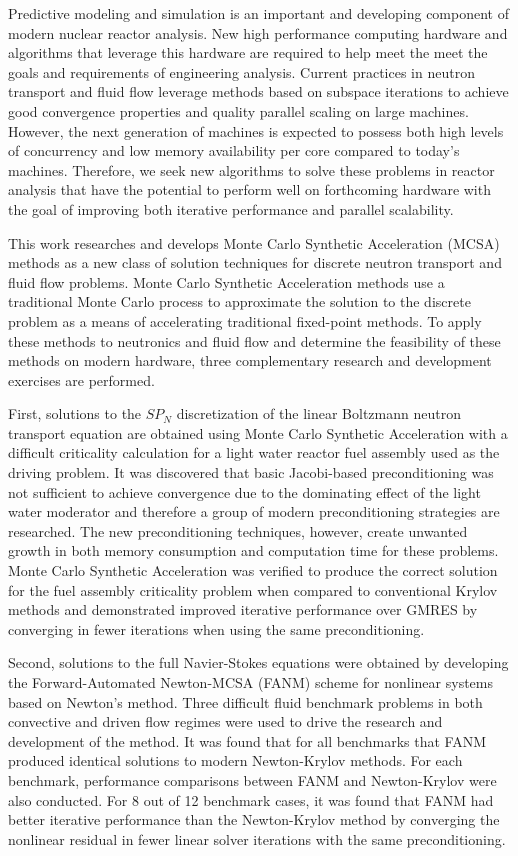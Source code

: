 Predictive modeling and simulation is an important and developing
component of modern nuclear reactor analysis. New high performance
computing hardware and algorithms that leverage this hardware are
required to help meet the meet the goals and requirements of
engineering analysis. Current practices in neutron transport and fluid
flow leverage methods based on subspace iterations to achieve good
convergence properties and quality parallel scaling on large
machines. However, the next generation of machines is expected to
possess both high levels of concurrency and low memory availability
per core compared to today's machines. Therefore, we seek new
algorithms to solve these problems in reactor analysis that have the
potential to perform well on forthcoming hardware with the goal of
improving both iterative performance and parallel scalability.

This work researches and develops Monte Carlo Synthetic Acceleration
(MCSA) methods as a new class of solution techniques for discrete
neutron transport and fluid flow problems. Monte Carlo Synthetic
Acceleration methods use a traditional Monte Carlo process to
approximate the solution to the discrete problem as a means of
accelerating traditional fixed-point methods. To apply these methods
to neutronics and fluid flow and determine the feasibility of these
methods on modern hardware, three complementary research and
development exercises are performed.

First, solutions to the $SP_N$ discretization of the linear Boltzmann
neutron transport equation are obtained using Monte Carlo Synthetic
Acceleration with a difficult criticality calculation for a light
water reactor fuel assembly used as the driving problem. It was
discovered that basic Jacobi-based preconditioning was not sufficient
to achieve convergence due to the dominating effect of the light water
moderator and therefore a group of modern preconditioning strategies
are researched. The new preconditioning techniques, however, create
unwanted growth in both memory consumption and computation time for
these problems. Monte Carlo Synthetic Acceleration was verified to
produce the correct solution for the fuel assembly criticality problem
when compared to conventional Krylov methods and demonstrated improved
iterative performance over GMRES by converging in fewer iterations
when using the same preconditioning.

Second, solutions to the full Navier-Stokes equations were obtained by
developing the Forward-Automated Newton-MCSA (FANM) scheme for
nonlinear systems based on Newton's method. Three difficult fluid
benchmark problems in both convective and driven flow regimes were
used to drive the research and development of the method. It was found
that for all benchmarks that FANM produced identical solutions to
modern Newton-Krylov methods. For each benchmark, performance
comparisons between FANM and Newton-Krylov were also conducted. For 8
out of 12 benchmark cases, it was found that FANM had better iterative
performance than the Newton-Krylov method by converging the nonlinear
residual in fewer linear solver iterations with the same
preconditioning.


